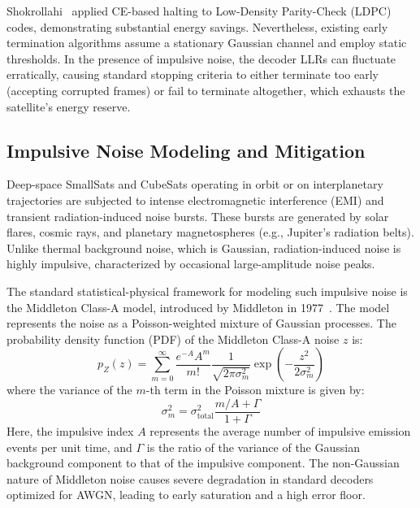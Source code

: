 \documentclass[journal,twocolumn]{IEEEtran}
\begin{document}
Shokrollahi~\cite{shokrollahi2004ldpc} applied CE-based halting to Low-Density Parity-Check (LDPC) codes, demonstrating substantial energy savings. Nevertheless, existing early termination algorithms assume a stationary Gaussian channel and employ static thresholds. In the presence of impulsive noise, the decoder LLRs can fluctuate erratically, causing standard stopping criteria to either terminate too early (accepting corrupted frames) or fail to terminate altogether, which exhausts the satellite's energy reserve.

\subsection{Impulsive Noise Modeling and Mitigation}
Deep-space SmallSats and CubeSats operating in orbit or on interplanetary trajectories are subjected to intense electromagnetic interference (EMI) and transient radiation-induced noise bursts. These bursts are generated by solar flares, cosmic rays, and planetary magnetospheres (e.g., Jupiter's radiation belts). Unlike thermal background noise, which is Gaussian, radiation-induced noise is highly impulsive, characterized by occasional large-amplitude noise peaks.

The standard statistical-physical framework for modeling such impulsive noise is the Middleton Class-A model, introduced by Middleton in 1977~\cite{middleton1977radiation}. The model represents the noise as a Poisson-weighted mixture of Gaussian processes. The probability density function (PDF) of the Middleton Class-A noise $z$ is:
\begin{equation}
  p_Z(z) = \sum_{m=0}^{\infty} \frac{e^{-A} A^m}{m!} \frac{1}{\sqrt{2\pi \sigma_m^2}} \exp\left(-\frac{z^2}{2\sigma_m^2}\right)
\end{equation}
where the variance of the $m$-th term in the Poisson mixture is given by:
\begin{equation}
  \sigma_m^2 = \sigma_{\text{total}}^2 \frac{m/A + \Gamma}{1+\Gamma}
\end{equation}
Here, the impulsive index $A$ represents the average number of impulsive emission events per unit time, and $\Gamma$ is the ratio of the variance of the Gaussian background component to that of the impulsive component. The non-Gaussian nature of Middleton noise causes severe degradation in standard decoders optimized for AWGN, leading to early saturation and a high error floor.
\end{document}
